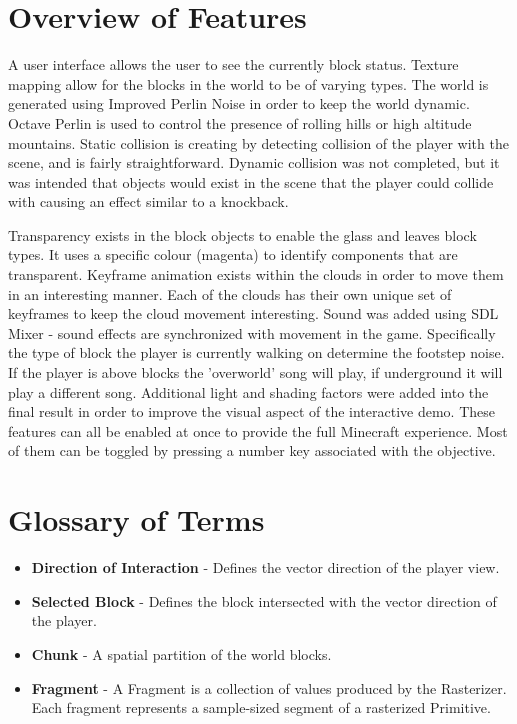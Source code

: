 \documentclass{book}
\begin{document}
\section{Overview of Features}
A user interface allows the user to see the currently block status.  Texture mapping allow for the blocks in the world to be of varying types.  The world is generated using Improved Perlin Noise in order to keep the world dynamic.  Octave Perlin is used to control the presence of rolling hills or high altitude mountains.  Static collision is creating by detecting collision of the player with the scene, and is fairly straightforward.  Dynamic collision was not completed, but it was intended that objects would exist in the scene that the player could collide with causing an effect similar to a knockback.  

Transparency exists in the block objects to enable the glass and leaves block types.  It uses a specific colour (magenta) to identify components that are transparent.  Keyframe animation exists within the clouds in order to move them in an interesting manner.  Each of the clouds has their own unique set of keyframes to keep the cloud movement interesting.  Sound was added using SDL Mixer - sound effects are synchronized with movement in the game.  Specifically the type of block the player is currently walking on determine the footstep noise.  If the player is above blocks the 'overworld' song will play, if underground it will play a different song. Additional light and shading factors were added into the final result in order to improve the visual aspect of the interactive demo.  These features can all be enabled at once to provide the full Minecraft experience. Most of them can be toggled by pressing a number key associated with the objective. 

\section{Glossary of Terms}
\begin{itemize}
\item \textbf{Direction of Interaction} - Defines the vector direction of the player view.
\item \textbf{Selected Block} - Defines the block intersected with the vector direction of the player.
\item \textbf{Chunk} - A spatial partition of the world blocks.
\item \textbf{Fragment} - A Fragment is a collection of values produced by the Rasterizer. Each fragment represents a sample-sized segment of a rasterized Primitive.
\end{itemize}
\end{document}
